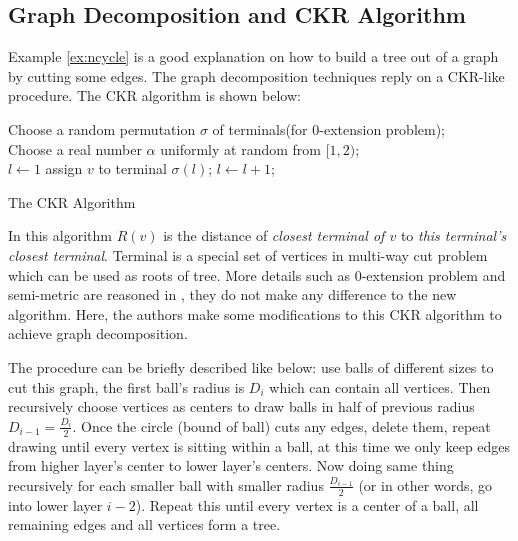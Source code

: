 \documentclass[11pt,twocolumn]{IEEEtran}
\begin{document}
\subsection{Graph Decomposition and CKR Algorithm}
\label{sec:CKR}
Example \ref{ex:ncycle} is a good explanation on how to build a tree out of a graph by cutting some edges.
The graph decomposition techniques reply on a CKR-like procedure. The CKR algorithm is shown below:
\begin{algorithm}[hbt]
\SetAlgoNoLine
  Choose a random permutation $\sigma$ of terminals(for 0-extension problem);\\
  Choose a real number $\alpha$ uniformly at random from $[1,2)$;\\
  {
  	$l \gets 1$\;
	{
		{
			assign $v$ to terminal $\sigma(l)$;
		}
		$l\gets l + 1$;
	}
   }
\caption {The CKR Algorithm}\label{alg:CKR}
\end{algorithm}
In this algorithm $R(v)$ is the distance of {\it closest terminal of $v$} to {\it this terminal's closest terminal}. 
Terminal is a special set of vertices in multi-way cut problem which can be used as roots of tree.
More details such as 0-extension problem and semi-metric are reasoned in \cite{CKR}, they do not make any difference to the new algorithm. Here, the authors make some modifications to this CKR algorithm
to achieve graph decomposition. 

The procedure can be briefly described like below: use balls of different sizes to cut this graph, the first
ball's radius is $D_i$ which can contain all vertices. Then recursively choose vertices as centers to draw
balls in half of previous radius $D_{i-1} = \frac{D_i}{2}$. Once the circle (bound of ball) cuts any edges,
delete them, repeat drawing until every vertex is sitting within a ball, at this time 
we only keep edges from higher layer's center to lower layer's centers. Now doing same thing recursively
for each smaller ball with smaller radius $\frac{D_{i-1}}{2}$ (or in other words, go into lower layer $i-2$).
 Repeat this until every vertex is a center of a ball, all remaining edges and all vertices form a tree.
 
\end{document}
